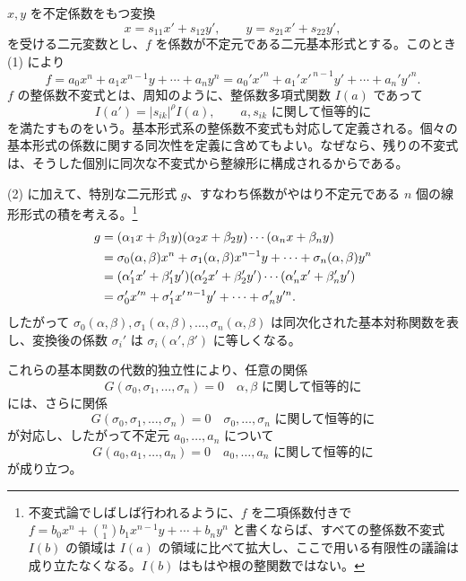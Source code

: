 \documentclass[11pt]{article}
\begin{document}
\(x,y\) を不定係数をもつ変換
\begin{equation}
        x=s_{11}x'+s_{12}y',\qquad y=s_{21}x'+s_{22}y',
\end{equation}
を受ける二元変数とし、\(f\) を係数が不定元である二元基本形式とする。このとき (1) により
\begin{equation}
        f=a_0x^n+a_1x^{n-1}y+\cdots+a_ny^n
        =a_0'x'^n+a_1'x'^{\,n-1}y'+\cdots+a_n'y'^n.
\end{equation}
\(f\) の整係数不変式とは、周知のように、整係数多項式関数 \(I(a)\) であって
\begin{equation}
        I(a')=|s_{ik}|^\rho I(a),\qquad \text{\(a,s_{ik}\) に関して恒等的に}
\end{equation}
を満たすものをいう。基本形式系の整係数不変式も対応して定義される。個々の基本形式の係数に関する同次性を定義に含めてもよい。なぜなら、残りの不変式は、そうした個別に同次な不変式から整線形に構成されるからである。

(2) に加えて、特別な二元形式 \(g\)、すなわち係数がやはり不定元である \(n\) 個の線形形式の積を考える。\footnote{不変式論でしばしば行われるように、\(f\) を二項係数付きで \(f=b_0x^n+\binom n1b_1x^{n-1}y+\cdots+b_ny^n\) と書くならば、すべての整係数不変式 \(I(b)\) の領域は \(I(a)\) の領域に比べて拡大し、ここで用いる有限性の議論は成り立たなくなる。\(I(b)\) はもはや根の整関数ではない。}
\begin{align}
        g&=(\alpha_1x+\beta_1y)(\alpha_2x+\beta_2y)\cdots(\alpha_nx+\beta_ny)\notag\\
         &=\sigma_0(\alpha,\beta)x^n+\sigma_1(\alpha,\beta)x^{n-1}y+\cdots+\sigma_n(\alpha,\beta)y^n\notag\\
         &=(\alpha_1'x'+\beta_1'y')(\alpha_2'x'+\beta_2'y')\cdots(\alpha_n'x'+\beta_n'y')\notag\\
         &=\sigma_0'x'^n+\sigma_1'x'^{\,n-1}y'+\cdots+\sigma_n'y'^n.
\end{align}
したがって \(\sigma_0(\alpha,\beta),\sigma_1(\alpha,\beta),\ldots,\sigma_n(\alpha,\beta)\) は同次化された基本対称関数を表し、変換後の係数 \(\sigma_i'\) は \(\sigma_i(\alpha',\beta')\) に等しくなる。

これらの基本関数の代数的独立性により、任意の関係
\begin{equation}
        G(\sigma_0,\sigma_1,\ldots,\sigma_n)=0
        \quad \text{\(\alpha,\beta\) に関して恒等的に}
\end{equation}
には、さらに関係
\begin{equation}
        G(\sigma_0,\sigma_1,\ldots,\sigma_n)=0
        \quad \text{\(\sigma_0,\ldots,\sigma_n\) に関して恒等的に}
\end{equation}
が対応し、したがって不定元 \(a_0,\ldots,a_n\) について
\begin{equation}
        G(a_0,a_1,\ldots,a_n)=0
        \quad \text{\(a_0,\ldots,a_n\) に関して恒等的に}
\end{equation}
が成り立つ。
\end{document}
